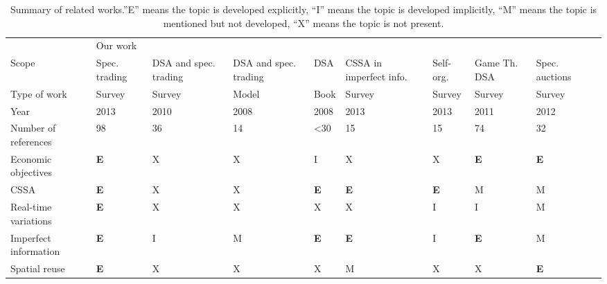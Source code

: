 \begin{landscape}
\begin{table}
\setlength{\tabcolsep}{3pt}
\scriptsize
\caption{Summary of related works.''E'' means the topic is developed explicitly, ``I'' means the topic is developed implicitly, ``M'' means the topic is mentioned but not developed, ``X'' means the topic is not present. }
\label{survey_table_related_work}
\begin{tabular}{p{4.5cm}lllllllll|}
\hline
&	Our work 			& \cite{ref:Maharjan2011} & \cite{ref:Niyato2008_Spec} 		& \cite{ref:Hossain2009} & \cite{ref:Huang2013} & \cite{ref:Zhang2013} 	& \cite{ref:Akkara2011} & \cite{ref:Zhang2012} \\

Scope																		& Spec. trading & DSA and spec. trading 	& DSA and spec. trading 				& DSA 									 & CSSA in imperfect info. & Self-org.	& Game Th. DSA  				& Spec. auctions \\
Type of work														& Survey 				& Survey 							 		& Model												  & Book					 				 & Survey 								 & Survey							& Survey 								& Survey \\
Year																		&	2013 					& 2010 										& 2008 													& 2008 									 & 2013 									 & 2013 							& 2011 									& 2012 \\
Number of references										&	98	 					& 36 											& 14 														& \textless 30 									 & 15 										 & 15 								& 74 										& 32 \\
\hline
Economic objectives											&	\textbf{E} 		& X												& X 														& I 										 & X 											 & X 									& \textbf{E} 						& \textbf{E} \\ 

CSSA																		&	\textbf{E} 		& X 											& X 														& \textbf{E} 						 & \textbf{E} 						 & \textbf{E} 				& M 										& M \\

Real-time variations										&	\textbf{E} 		& X 											& X 														& X 										 & X											 & I 									& I 										& M \\

Imperfect information										&	\textbf{E} 		& I 											& M 														& \textbf{E} 						 & \textbf{E}							 & I 									& \textbf{E} 						& M \\

Spatial reuse														&	\textbf{E} 		& X 											& X 														& X 										 & M											 & X 									& X 										& \textbf{E} \\


\end{tabular}
\end{table}
\end{landscape}
